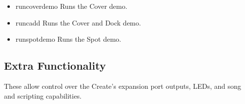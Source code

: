 \documentclass {article}
\begin{document}
\begin {itemize}
\item {} {runcoverdemo}
  Runs the Cover demo. \\
  \retnorm

\item {} {runcadd}
  Runs the Cover and Dock demo. \\
  \retnorm

\item {} {runspotdemo}
  Runs the Spot demo. \\
  \retnorm
\end {itemize}

\subsection {Extra Functionality}
These allow control over the Create's expansion port outputs, LEDs,
and song and scripting capabilities.
\end{document}
